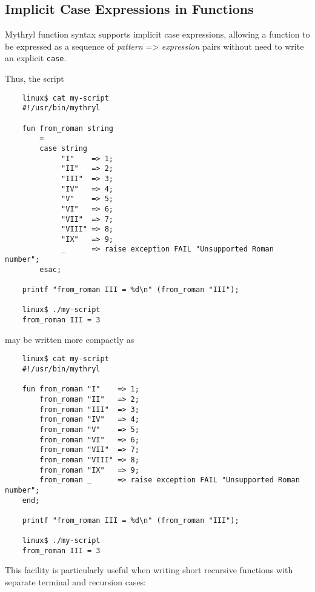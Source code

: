 \cutend*



\subsection{Implicit Case Expressions in Functions}
\label{section:ref:functions:implicit-case-expressions-in-functions}

Mythryl function syntax supports implicit case expressions, allowing 
a function to be expressed as a sequence of {\it pattern} => {\it expression} 
pairs without need to write an explicit {\tt case}.

Thus, the script

\begin{verbatim}
    linux$ cat my-script
    #!/usr/bin/mythryl

    fun from_roman string
        =
        case string
             "I"    => 1;
             "II"   => 2;
             "III"  => 3;
             "IV"   => 4;
             "V"    => 5;
             "VI"   => 6;
             "VII"  => 7;
             "VIII" => 8;
             "IX"   => 9;
             _      => raise exception FAIL "Unsupported Roman number";
        esac;

    printf "from_roman III = %d\n" (from_roman "III");

    linux$ ./my-script
    from_roman III = 3
\end{verbatim}

may be written more compactly as

\begin{verbatim}
    linux$ cat my-script
    #!/usr/bin/mythryl

    fun from_roman "I"    => 1;
        from_roman "II"   => 2;
        from_roman "III"  => 3;
        from_roman "IV"   => 4;
        from_roman "V"    => 5;
        from_roman "VI"   => 6;
        from_roman "VII"  => 7;
        from_roman "VIII" => 8;
        from_roman "IX"   => 9;
        from_roman _      => raise exception FAIL "Unsupported Roman number";
    end;

    printf "from_roman III = %d\n" (from_roman "III");

    linux$ ./my-script
    from_roman III = 3
\end{verbatim}

This facility is particularly useful when writing short 
recursive functions with separate terminal and recursion 
cases:

